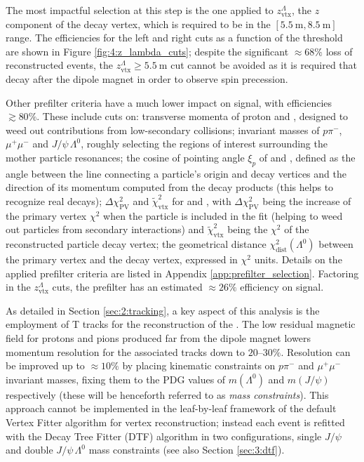 The most impactful selection at this step is the one applied to $z_\text{vtx}^\Lambda$, the $z$ component of the \lambdadecay decay vertex, which is required to be in the $[\SI{5.5}{\meter}, \SI{8.5}{\meter}]$ range.
The efficiencies for the left and right cuts as a function of the threshold are shown in Figure \ref{fig:4:z_lambda_cuts};
despite the significant $\approx 68\%$ loss of reconstructed \demonstratorshort events, the $z_\text{vtx}^\Lambda \geq \SI{5.5}{\meter}$ cut cannot be avoided as it is required that \lz decay after the dipole magnet in order to observe spin precession.

Other prefilter criteria have a much lower impact on signal, with efficiencies $\gtrsim 80\%$.
These include cuts on:
transverse momenta of proton and \lz, designed to weed out contributions from low-\pt secondary collisions;
invariant masses of $p\pi^-$, $\mu^+ \mu^-$ and $J/\psi\,\Lambda^0$, roughly selecting the regions of interest surrounding the mother particle resonances;
the cosine of pointing angle $\xi_p$ of \lz and \lbz, defined as the angle between the line connecting a particle's origin and decay vertices and the direction of its momentum computed from the decay products (this helps to recognize real decays);
$\Delta \chi^2_\text{PV}$ and $\tilde{\chi}^2_\text{vtx}$ for \lbz and \lz, with $\Delta \chi^2_\text{PV}$ being the increase of the primary vertex $\chi^2$ when the particle is included in the fit (helping to weed out particles from secondary interactions) and $\tilde{\chi}^2_\text{vtx}$ being the $\chi^2$ of the reconstructed particle decay vertex;
the geometrical distance $\chi^2_\text{dist}(\Lambda^0)$ between the primary vertex and the \lz decay vertex, expressed in $\chi^2$ units.
Details on the applied prefilter criteria are listed in Appendix \ref{app:prefilter_selection}.
Factoring in the $z_\text{vtx}^\Lambda$ cuts, the prefilter has an estimated $\approx 26\%$ efficiency on \demonstratorshort signal.

As detailed in Section \ref{sec:2:tracking}, a key aspect of this analysis is the employment of T tracks for the reconstruction of the \lz.
The low residual magnetic field for protons and pions produced far from the dipole magnet lowers momentum resolution for the associated tracks down to $20$--$30\%$.
Resolution can be improved up to $\approx 10\%$ by placing kinematic constraints on $p\pi^-$ and $\mu^+ \mu^-$ invariant masses, fixing them to the PDG values of $m(\Lambda^0)$ and $m(J/\psi)$ respectively (these will be henceforth referred to as \textit{mass constraints}).
This approach cannot be implemented in the leaf-by-leaf framework of the default Vertex Fitter algorithm for vertex reconstruction;
instead each event is refitted with the Decay Tree Fitter (DTF) algorithm in two configurations, single $J/\psi$ and double $J/\psi\,\Lambda^0$ mass constraints (see also Section \ref{sec:3:dtf}).

